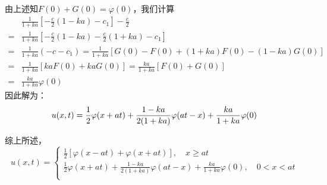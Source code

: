\begin{questions}
\begin{solution}
由上述知$ F(0)+G(0)=\varphi(0)$，我们计算
$$ \begin{aligned} & \frac{1}{1+k a}\left[-\frac{c}{2}(1-k a)-c_{1}\right]-\frac{c}{2} \\ = & \frac{1}{1+k a}\left[-\frac{c}{2}(1-k a)-\frac{c}{2}(1+k a)-c_{1}\right] \\ = & \frac{1}{1+k a}\left(-c-c_{1}\right)=\frac{1}{1+k a}[G(0)-F(0)+(1+k a) F(0)-(1-k a) G(0)] \\ = & \frac{1}{1+k a}[k a F(0)+k a G(0)]=\frac{k a}{1+k a}[F(0)+G(0)] \\ = & \frac{k a}{1+k a} \varphi(0)\end{aligned} $$
因此解为：
$$ u(x, t)=\frac{1}{2} \varphi(x+a t)+\frac{1-k a}{2(1+k a)} \varphi (a t-x)+\frac{k a}{1+k a} \varphi(0) \\$$

综上所述，
$$
u(x,t)=\left\{\begin{array}{l}
	\frac{1}{2}[\varphi(x-a t)+\varphi(x+a t)] ,\quad x \geq at\\
	\frac{1}{2} \varphi(x+a t)+\frac{1-k a}{2(1+k a)} \varphi(a t-x)+\frac{k a}{1+k a} \varphi(0) , \quad 0< x< at\\
\end{array}\right.
$$
\end{solution}
\end{questions}